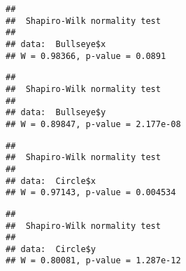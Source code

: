 \documentclass[
]{article}
\newenvironment{Shaded}{\begin{snugshade}}{\end{snugshade}}
\newcommand{\FunctionTok}[1]{\textcolor[rgb]{0.13,0.29,0.53}{\textbf{#1}}}
\newcommand{\NormalTok}[1]{#1}
\newcommand{\OtherTok}[1]{\textcolor[rgb]{0.56,0.35,0.01}{#1}}
\newcommand{\SpecialCharTok}[1]{\textcolor[rgb]{0.81,0.36,0.00}{\textbf{#1}}}
\newcommand{\StringTok}[1]{\textcolor[rgb]{0.31,0.60,0.02}{#1}}
\begin{document}
\begin{verbatim}
## 
##  Shapiro-Wilk normality test
## 
## data:  Bullseye$x
## W = 0.98366, p-value = 0.0891
\end{verbatim}

\begin{Shaded}
\end{Shaded}

\begin{verbatim}
## 
##  Shapiro-Wilk normality test
## 
## data:  Bullseye$y
## W = 0.89847, p-value = 2.177e-08
\end{verbatim}

\begin{Shaded}
\end{Shaded}

\begin{verbatim}
## 
##  Shapiro-Wilk normality test
## 
## data:  Circle$x
## W = 0.97143, p-value = 0.004534
\end{verbatim}

\begin{Shaded}
\end{Shaded}

\begin{verbatim}
## 
##  Shapiro-Wilk normality test
## 
## data:  Circle$y
## W = 0.80081, p-value = 1.287e-12
\end{verbatim}

\begin{Shaded}
\end{Shaded}
\end{document}
